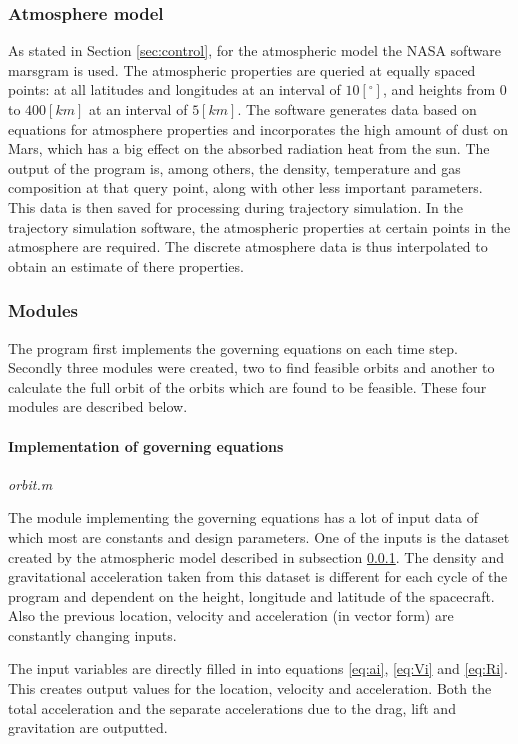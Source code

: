\subsubsection{Atmosphere model}\label{subsec:atmos}
As stated in Section \ref{sec:control}, for the atmospheric model the NASA software \gls{marsgram} is used. The atmospheric properties are queried at equally spaced points: at all latitudes and longitudes at an interval of $10 [^\circ]$, and heights from $0$ to $400 [km]$ at an interval of $5 [km]$. The software generates data based on equations for atmosphere properties and incorporates the high amount of dust on Mars, which has a big effect on the absorbed radiation heat from the sun. The output of the program is, among others, the density, temperature and gas composition at that query point, along with other less important parameters. \cite{Justus2001}
This data is then saved for processing during trajectory simulation. In the trajectory simulation software, the atmospheric properties at certain points in the atmosphere are required. The discrete atmosphere data is thus interpolated to obtain an estimate of there properties. 

\subsubsection{Modules} \label{subsec:modules}

The program first implements the governing equations on each time step. Secondly three modules were created, two to find feasible orbits and another to calculate the full orbit of the orbits which are found to be feasible. These four modules are described below.

\paragraph{Implementation of governing equations}\textit{orbit.m}

The module implementing the governing equations has a lot of input data of which most are constants and design parameters. One of the inputs is the dataset created by the atmospheric model described in subsection \ref{subsec:atmos}. The density and gravitational acceleration taken from this dataset is different for each cycle of the program and dependent on the height, longitude and latitude of the spacecraft. Also the previous location, velocity and acceleration (in vector form) are constantly changing inputs.

The input variables are directly filled in into equations \ref{eq:ai}, \ref{eq:Vi} and \ref{eq:Ri}. This creates output values for the location, velocity and acceleration. Both the total acceleration and the separate accelerations due to the drag, lift and gravitation are outputted.

